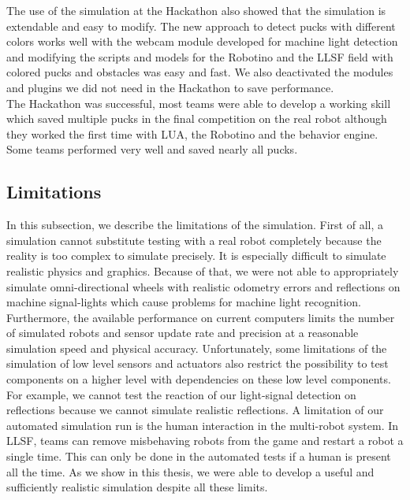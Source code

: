 The use of the simulation at the Hackathon also showed that the simulation is extendable and easy to modify. The new approach to detect pucks with different colors works well with the webcam module developed for machine light detection and modifying the scripts and  models for the Robotino and the LLSF field with colored pucks and obstacles was easy and fast. We also deactivated the modules and plugins we did not need in the Hackathon to save performance.\\
The Hackathon was successful, most teams were able to develop a working skill which saved multiple pucks in the final competition on the real robot although they worked the first time with LUA, the Robotino and the behavior engine. Some teams performed very well and saved nearly all pucks.

\subsection{Limitations}
In this subsection, we describe the limitations of the simulation. First of all, a simulation cannot substitute testing with a real robot completely because the reality is too complex to simulate precisely. It is especially difficult to simulate realistic physics and graphics. Because of that, we were not able to appropriately simulate omni-directional wheels with realistic odometry errors and reflections on machine signal-lights which cause problems for machine light recognition. Furthermore, the available performance on current computers limits the number of simulated robots and sensor update rate and precision at a reasonable simulation speed and physical accuracy. Unfortunately, some limitations of the simulation of low level sensors and actuators also restrict the possibility to test components on a higher level with dependencies on these low level components. For example, we cannot test the reaction of our light-signal detection on reflections because we cannot simulate realistic reflections. A limitation of our automated simulation run is the human interaction in the multi-robot system. In LLSF, teams can remove misbehaving robots from the game and restart a robot a single time. This can only be done in the automated tests if a human is present all the time. As we show in this thesis, we were able to develop a useful and sufficiently realistic simulation despite all these limits.\\

